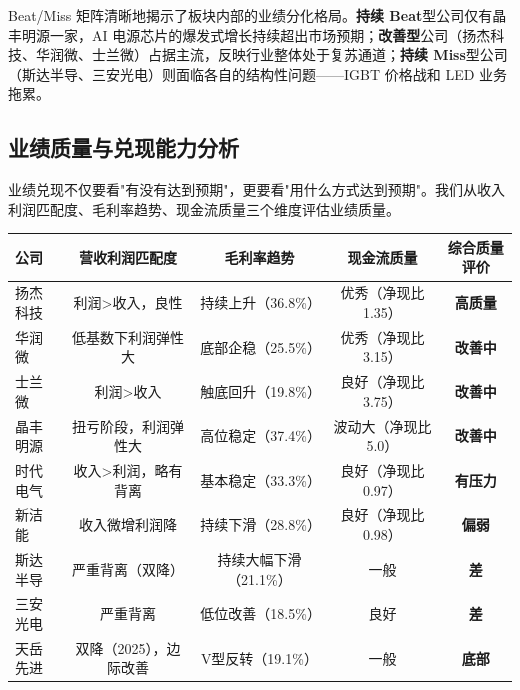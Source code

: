 Beat/Miss 矩阵清晰地揭示了板块内部的业绩分化格局。\textbf{持续 Beat}型公司仅有晶丰明源一家，AI 电源芯片的爆发式增长持续超出市场预期；\textbf{改善型}公司（扬杰科技、华润微、士兰微）占据主流，反映行业整体处于复苏通道；\textbf{持续 Miss}型公司（斯达半导、三安光电）则面临各自的结构性问题——IGBT 价格战和 LED 业务拖累。

\subsection{业绩质量与兑现能力分析}

业绩兑现不仅要看"有没有达到预期"，更要看"用什么方式达到预期"。我们从收入利润匹配度、毛利率趋势、现金流质量三个维度评估业绩质量。

\begin{exhibitbox}[表 7-7：业绩质量多维度对比]
\centering
\small
\begin{tabularx}{\textwidth}{X c c c c}
\toprule
\textbf{公司} & \textbf{营收利润匹配度} & \textbf{毛利率趋势} & \textbf{现金流质量} & \textbf{综合质量评价} \\
\midrule
\rowcolor{riskgreen!10}
扬杰科技 & 利润>收入，良性 & 持续上升（36.8\%） & 优秀（净现比 1.35） & \textbf{高质量} \\
\rowcolor{riskgreen!10}
华润微 & 低基数下利润弹性大 & 底部企稳（25.5\%） & 优秀（净现比 3.15） & \textbf{改善中} \\
\rowcolor{riskamber!10}
士兰微 & 利润>收入 & 触底回升（19.8\%） & 良好（净现比 3.75） & \textbf{改善中} \\
\rowcolor{riskamber!10}
晶丰明源 & 扭亏阶段，利润弹性大 & 高位稳定（37.4\%） & 波动大（净现比 5.0） & \textbf{改善中} \\
\rowcolor{riskamber!10}
时代电气 & 收入>利润，略有背离 & 基本稳定（33.3\%） & 良好（净现比 0.97） & \textbf{有压力} \\
\rowcolor{riskred!10}
新洁能 & 收入微增利润降 & 持续下滑（28.8\%） & 良好（净现比 0.98） & \textbf{偏弱} \\
\rowcolor{riskred!10}
斯达半导 & 严重背离（双降） & 持续大幅下滑（21.1\%） & 一般 & \textbf{差} \\
\rowcolor{riskred!10}
三安光电 & 严重背离 & 低位改善（18.5\%） & 良好 & \textbf{差} \\
\rowcolor{riskred!10}
天岳先进 & 双降（2025），边际改善 & V型反转（19.1\%） & 一般 & \textbf{底部} \\
\bottomrule
\end{tabularx}
\end{exhibitbox}

